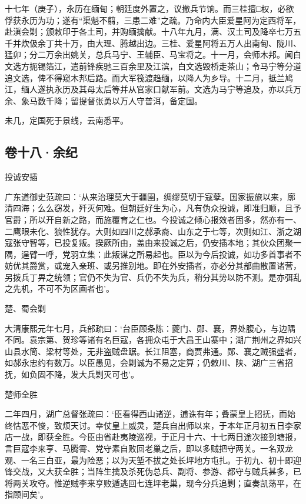 \documentclass[]{article}
\begin{document}
十七年（庚子），永历在缅甸；朝廷度外置之，议撤兵节饷。而三桂擅□权，必欲俘获永历为功；遂有``渠魁不翦，三患二难''之疏。乃命内大臣爱星阿为定西将军，赴滇会剿；颁敕印于各土司，并购缅擒献。十八年九月，满、汉土司及降卒七万五千并炊伋余丁共十万，由大理、腾越出边。三桂、爱星阿将五万人出南甸、陇川、猛卯；分二万余出姚关，总兵马宁、王辅臣、马宝将之。十一月，会师木邦。闻白文选方扼锡箔江，遣前锋疾驰三百余里及江滨，白文选毁桥走茶山；令马宁等分道追文选，俾不得窥木邦后路。而大军筏渡趋缅，以降人为乡导。十二月，抵兰鸠江，缅人遂执永历及其母太后等并从官家口献军前。文选为马宁等追及，亦以兵万余、象马数千降；留提督张勇以万人守普洱，备定国。

未几，定国死于景线，云南悉平。

\hypertarget{header-n3068}{%
\subsection{卷十八·余纪}\label{header-n3068}}

投诚安插

广东道御史范疏曰：`从来治理莫大于疆圉，绸缪莫切于寇孽。国家振旅以来，廓清四海；么么窃发，歼灭何难。但朝廷好生为心，凡有伪众投诚，即准归顺，且予官爵；所以开自新之路，而施覆育之仁也。今投诚之倾心报效者固多，然亦有一、二鹰眼未化、狼性犹存。大则如四川之郝承裔、山东之于七等，次则如江、浙之湖寇张守智等，已投复叛。揆厥所由，盖由来投诚之后，仍安插本地；其伙众团聚一隅，逞臂一呼，党羽立集：此叛谋之所易起也。臣以为今后投诚，如功多首事者不妨优其爵赏，或宠入亲班、或另推别地。即在外安插者，亦必分其部曲散置诸营，另拨兵丁畀之统领；官仍不失为官、兵仍不失为兵，稍分其势以防不测。是亦弭乱之先机，不可不为区画者也'。

楚、蜀会剿

大清康熙元年七月，兵部疏曰：`台臣顾条陈：夔门、郧、襄，界处腹心，与边隅不同。袁宗第、贺珍等诸有名巨寇，各拥众屯于大昌王山寨中；湖广荆州之界如兴山县水筒、梁材等处，无非盗贼盘踞。长江阻塞，商贾弗通。郧、襄之贼强盛者，如郝永忠约有数万。以臣愚见，会剿诚为不易之定算；仍敕川、陕、湖广三省招抚，如负固不降，发大兵剿灭可也'。

楚师全胜

二年四月，湖广总督张疏曰：`臣看得西山诸逆，逋诛有年；叠蒙皇上招抚，而始终怙恶不悛，致烦天讨。幸仗皇上威灵，楚兵自出师以来，于本年正月初五日李家店一战，即获全胜。今臣由省赴夷陵巡视，于正月十六、十七两日途次接到塘报，言巨寇李来亨、马腾霄、党守素自败回老巢之后，即以多贼把守两关。一名双龙观、一名三白亚，最为险恶；以为天堑不拔之处长坪地方屯扎。于初九、初十即迎锋交战，又大获全胜；当阵生擒及杀死伪总兵、副将、参游、都守与贼兵甚多，已将两关攻夺。惟逆贼李来亨败遁逃回七连坪老巢，现今分兵追剿；直奏凯荡平，在指顾间矣'。
\end{document}
